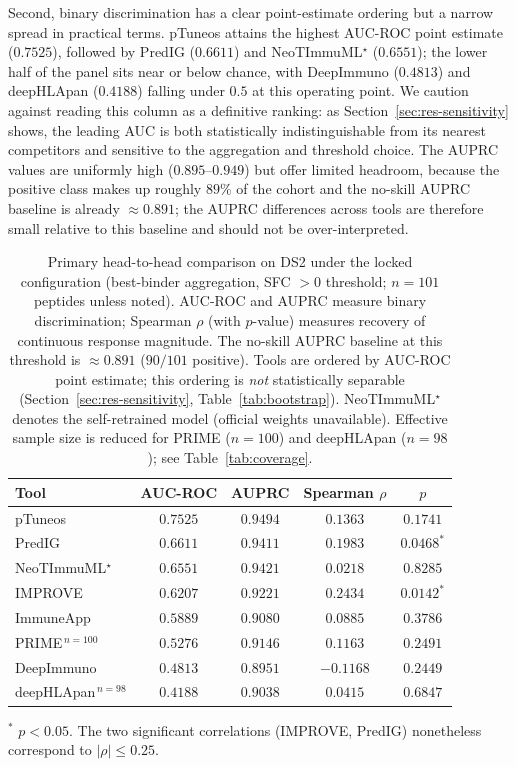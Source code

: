 Second, binary discrimination has a clear point-estimate ordering but a narrow
spread in practical terms. pTuneos attains the highest AUC-ROC point estimate
($0.7525$), followed by PredIG ($0.6611$) and NeoTImmuML$^\star$ ($0.6551$); the
lower half of the panel sits near or below chance, with DeepImmuno ($0.4813$) and
deepHLApan ($0.4188$) falling under $0.5$ at this operating point. We caution
against reading this column as a definitive ranking: as Section~\ref{sec:res-sensitivity}
shows, the leading AUC is both statistically indistinguishable from its nearest
competitors and sensitive to the aggregation and threshold choice. The AUPRC
values are uniformly high ($0.895$--$0.949$) but offer limited headroom, because
the positive class makes up roughly $89\%$ of the cohort and the no-skill AUPRC
baseline is already $\approx 0.891$; the AUPRC differences across tools are
therefore small relative to this baseline and should not be over-interpreted.

\begin{table}[t]
\centering
\caption{Primary head-to-head comparison on DS2 under the locked configuration
(best-binder aggregation, SFC $>0$ threshold; $n = 101$ peptides unless noted).
AUC-ROC and AUPRC measure binary discrimination; Spearman $\rho$ (with $p$-value)
measures recovery of continuous response magnitude. The no-skill AUPRC baseline at
this threshold is $\approx 0.891$ ($90/101$ positive). Tools are ordered by
AUC-ROC point estimate; this ordering is \emph{not} statistically separable
(Section~\ref{sec:res-sensitivity}, Table~\ref{tab:bootstrap}).
NeoTImmuML$^\star$ denotes the self-retrained model (official weights
unavailable). Effective sample size is reduced for PRIME ($n = 100$) and
deepHLApan ($n = 98$); see Table~\ref{tab:coverage}.}
\label{tab:main}
\begin{tabular}{lcccc}
\toprule
Tool & AUC-ROC & AUPRC & Spearman $\rho$ & $p$ \\
\midrule
pTuneos            & $0.7525$ & $0.9494$ & $0.1363$  & $0.1741$ \\
PredIG             & $0.6611$ & $0.9411$ & $0.1983$  & $0.0468^{*}$ \\
NeoTImmuML$^\star$ & $0.6551$ & $0.9421$ & $0.0218$  & $0.8285$ \\
IMPROVE            & $0.6207$ & $0.9221$ & $0.2434$  & $0.0142^{*}$ \\
ImmuneApp          & $0.5889$ & $0.9080$ & $0.0885$  & $0.3786$ \\
PRIME$^{\,n=100}$  & $0.5276$ & $0.9146$ & $0.1163$  & $0.2491$ \\
DeepImmuno         & $0.4813$ & $0.8951$ & $-0.1168$ & $0.2449$ \\
deepHLApan$^{\,n=98}$ & $0.4188$ & $0.9038$ & $0.0415$ & $0.6847$ \\
\bottomrule
\end{tabular}

\vspace{2pt}
{\footnotesize $^{*}$ $p < 0.05$. The two significant correlations
(IMPROVE, PredIG) nonetheless correspond to $|\rho| \le 0.25$.}
\end{table}

